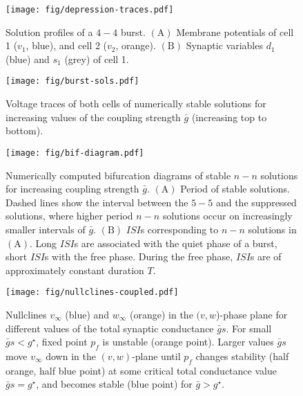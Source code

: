 \documentclass[utf8, draft]{frontiersFPHY} %
\newcommand{\gbar}{\bar g}
\begin{document}
\begin{figure}[h!]
  \centering
  \texttt{[image: fig/depression-traces.pdf]}
  \caption{Solution profiles of a \(4-4\) burst. \(\bm{\mathrm{(A)}}\) Membrane potentials
    of cell 1 (\(v_{1}\), blue), and cell 2 (\(v_{2}\), orange). \(\bm{\mathrm{(B)}}\)
    Synaptic variables \(d_{1}\) (blue) and \(s_{1}\) (grey) of cell
    1.~\label{fig:depression-traces}}
\end{figure}

\begin{figure}[h!]
  \centering
  \texttt{[image: fig/burst-sols.pdf]}
  \caption{Voltage traces of both cells of numerically stable solutions for increasing
    values of the coupling strength \(\gbar\) (increasing top to
    bottom).~\label{fig:burst-sols}}
\end{figure}

\begin{figure}[h!]
  \centering
  \texttt{[image: fig/bif-diagram.pdf]}
  \caption{Numerically computed bifurcation diagrams of stable \(n-n\) solutions for
    increasing coupling strength \(\gbar\). \(\bm{\mathrm{(A)}}\) Period of stable
    solutions. Dashed lines show the interval between the \(5-5\) and the suppressed
    solutions, where higher period \(n-n\) solutions occur on increasingly smaller intervals
    of \(\gbar\). \(\bm{\mathrm{(B)}}\) \(ISI\)s corresponding to \(n-n\) solutions in
    \(\mathrm{(A)}\). Long \(ISI\)s are associated with the quiet phase of a burst, short
    \(ISI\)s with the free phase. During the free phase, \(ISI\)s are of approximately
    constant duration \(T\).\label{fig:bif-diagram}}
\end{figure}

\begin{figure}[h!]
  \centering
  \texttt{[image: fig/nullclines-coupled.pdf]}
  \caption{Nullclines \(v_{\infty}\) (blue) and \(w_{\infty}\) (orange) in the
  \((v,w\))-phase plane for different values of the total synaptic conductance \(\gbar
  s\). For small \(\gbar s < g^{\star}\), fixed point \(p_{f}\) is unstable (orange
  point). Larger values \(\gbar s\) move \(v_{\infty}\) down in the \((v,w)\)-plane until
  \(p_{f}\) changes stability (half orange,  half blue point) at some critical total
  conductance value \(\gbar s = g^{\star}\), and becomes stable (blue point) for
  \(\gbar>g^{\star}\).~\label{fig:nullclines-coupled}}
\end{figure}
\end{document}

